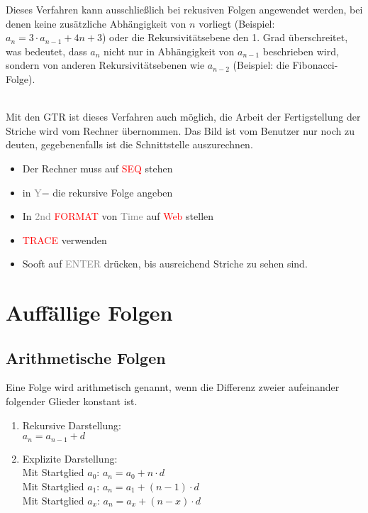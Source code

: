\documentclass[../MAIN/main.tex]{subfiles}
\begin{document}
\begin{Bemerkung}
Dieses Verfahren kann ausschließlich bei rekusiven Folgen angewendet werden, bei denen keine zusätzliche Abhängigkeit von $n$ vorliegt (Beispiel: $a_{n}=3\cdot a_{n-1}+4n+3$) oder die Rekursivitätsebene den 1. Grad überschreitet, was bedeutet, dass $a_{n}$ nicht nur in Abhängigkeit von $a_{n-1}$ beschrieben wird, sondern von anderen Rekursivitätsebenen wie $a_{n-2}$ (Beispiel: die Fibonacci-Folge).\\
\end{Bemerkung}

\begin{GTR-Tipp}
\\
Mit den GTR ist dieses Verfahren auch möglich, die Arbeit der Fertigstellung der Striche wird vom Rechner übernommen. Das Bild ist vom Benutzer nur noch zu deuten, gegebenenfalls ist die Schnittstelle auszurechnen.
\begin{itemize}
\item Der Rechner muss auf \textcolor{red}{SEQ} stehen
\item in \textcolor{gray}{Y=} die rekursive Folge angeben
\item In \textcolor{gray}{2nd }\textcolor{red}{FORMAT} von \textcolor{gray}{Time} auf \textcolor{red}{Web} stellen
\item \textcolor{red}{TRACE} verwenden
\item Sooft auf \textcolor{gray}{ENTER} drücken, bis ausreichend Striche zu sehen sind.
\end{itemize}

\end{GTR-Tipp}


		\section{Auffällige Folgen}


	\subsection{Arithmetische Folgen}

\begin{Definition}
Eine Folge wird arithmetisch genannt, wenn die Differenz zweier aufeinander folgender Glieder konstant ist.
\begin{enumerate}
\item Rekursive Darstellung:\\
\indent $a_{n}=a_{n-1}+d$
\item Explizite Darstellung:\\
\indent Mit Startglied $a_{0}$: $a_{n}=a_{0}+n\cdot d$\\
\indent Mit Startglied $a_{1}$: $a_{n}=a_{1}+(n-1)\cdot d$\\
\indent Mit Startglied $a_{x}$: $a_{n}=a_{x}+(n-x)\cdot d$
\end{enumerate}
\end{Definition}
\end{document}
